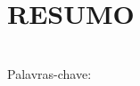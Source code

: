 \newpage
\thispagestyle{empty}
\section*{\centering RESUMO}
\vspace{1cm}
\singlespacing
\tituloresumo
\bigskip

{\onehalfspacing
\hspace*{-0.8cm}\resumoPT \\
\vfill
\hspace*{-0.6cm}Palavras-chave: \keywordsPT
}
